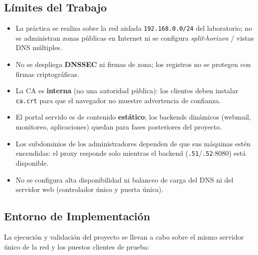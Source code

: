 \subsection{L\'imites del Trabajo}

\begin{itemize}
  \item La pr\'actica se realiza sobre la red aislada
        \texttt{192.168.0.0/24} del laboratorio; no se administran zonas
        p\'ublicas en Internet ni se configura \textit{split-horizon} /
        vistas DNS m\'ultiples.
  \item No se despliega \textbf{DNSSEC} ni firmas de zona; los registros no se
        protegen con firmas criptogr\'aficas.
  \item La CA es \textbf{interna} (no una autoridad p\'ublica): los clientes
        deben instalar \texttt{ca.crt} para que el navegador no muestre
        advertencia de confianza.
  \item El portal servido es de contenido \textbf{est\'atico}; los backends
        din\'amicos (webmail, monitoreo, aplicaciones) quedan para fases
        posteriores del proyecto.
  \item Los subdominios de los administradores dependen de que sus m\'aquinas
        est\'en encendidas: el proxy responde solo mientras el backend
        (\texttt{.51}/\texttt{.52}:8080) est\'a disponible.
  \item No se configura alta disponibilidad ni balanceo de carga del DNS ni
        del servidor web (controlador \'unico y puerta \'unica).
\end{itemize}

\subsection{Entorno de Implementaci\'on}

La ejecuci\'on y validaci\'on del proyecto se llevan a cabo sobre el mismo
servidor \'unico de la red y los puestos clientes de prueba:

